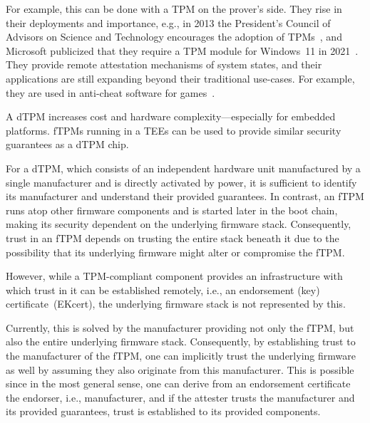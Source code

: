 For example, this can be done with a \acf{TPM} on the prover's side. They rise in their deployments and importance, e.g., in 2013 the President's Council of Advisors on Science and Technology encourages the adoption of TPMs~\cite{usa}, and Microsoft publicized that they require a TPM module for Windows~11 in 2021~\cite{win11req}.
They provide remote attestation mechanisms of system states, and their applications are still expanding beyond their traditional use-cases. For example, they are used in anti-cheat software for games~\cite{valorant}.


A \acf{dTPM} increases cost and hardware complexity---especially for embedded platforms.
\Acfp{fTPM} running in a \acp{TEE} can be used to provide similar security guarantees as a \ac{dTPM} chip.


For a \ac{dTPM}, which consists of an independent hardware unit manufactured by a single manufacturer and is directly activated by power, it is sufficient to identify its manufacturer and understand their provided guarantees.
In contrast, an \ac{fTPM} runs atop other firmware components and is started later in the boot chain, making its security dependent on the underlying firmware stack.
Consequently, trust in an \ac{fTPM} depends on trusting the entire stack beneath it due to the possibility that its underlying firmware might alter or compromise the \ac{fTPM}.


However, while a TPM-compliant component provides an infrastructure with which trust in it can be established remotely, i.e., an endorsement (key) certificate~(EKcert), the underlying firmware stack is not represented by this.


Currently, this is solved by the manufacturer providing not only the fTPM, but also the entire underlying firmware stack.
Consequently, by establishing trust to the manufacturer of the fTPM, one can implicitly trust the underlying firmware as well by assuming they also originate from this manufacturer.
This is possible since in the most general sense, one can derive from an endorsement certificate the endorser, i.e., manufacturer, and if the attester trusts the manufacturer and its provided guarantees, trust is established to its provided components.

